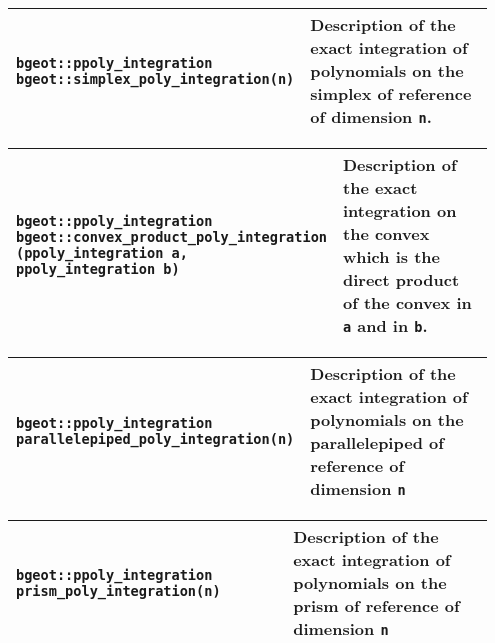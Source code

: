 \begin{center} \begin{tabular}{|m{0.55\linewidth}|m{0.4\linewidth}|} \hline
{\tt bgeot::ppoly\_integration bgeot::simplex\_poly\_integration(n)} & Description of the exact integration of polynomials on the simplex of reference of dimension {\tt n}. \\ \hline
\end{tabular}  
\begin{tabular}{|m{0.55\linewidth}|m{0.4\linewidth}|} \hline
{\tt bgeot::ppoly\_integration bgeot::convex\_product\_poly\_integration (ppoly\_integration a, ppoly\_integration b)} & Description of the exact integration on the convex which is the direct product of the convex in {\tt a} and in {\tt b}.\\ \hline
\end{tabular}  
\begin{tabular}{|m{0.55\linewidth}|m{0.4\linewidth}|} \hline
{\tt bgeot::ppoly\_integration parallelepiped\_poly\_integration(n)} & Description of the exact integration of polynomials on the parallelepiped of reference of dimension {\tt n}\\ \hline
\end{tabular}  
\begin{tabular}{|m{0.55\linewidth}|m{0.4\linewidth}|} \hline
{\tt bgeot::ppoly\_integration prism\_poly\_integration(n)} & Description of the exact integration of polynomials on the prism of reference of dimension {\tt n}\\ \hline
\end{tabular} \end{center}
